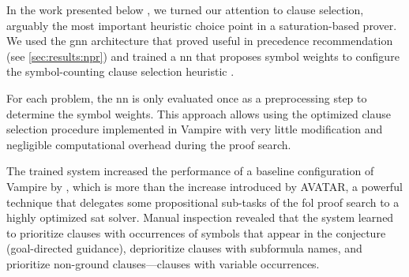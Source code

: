 



\label{sec:results:selection}

In the work presented below \cite{DBLP:conf/lpar/Bartek023},
we turned our attention to clause selection,
arguably the most important heuristic choice point in a saturation-based prover.
We used the \gls{gnn} architecture
that proved useful in precedence recommendation (see \cref{sec:results:npr})
and trained a \gls{nn} that proposes symbol weights to configure the symbol-counting clause selection heuristic \cite{DBLP:conf/cade/SchulzM16,E-manual}.

For each problem, the \gls{nn} is only evaluated once as a preprocessing step to determine the symbol weights.
This approach allows using the optimized clause selection procedure implemented in Vampire
with very little modification and negligible computational overhead during the proof search.

The trained system increased the performance of a baseline configuration of Vampire by ,
which is more than the increase introduced by AVATAR,
a powerful technique that delegates some propositional sub-tasks of the \gls{fol} proof search to a highly optimized \gls{sat} solver.
Manual inspection revealed that
the system learned to
prioritize clauses with occurrences of symbols that appear in the conjecture (goal-directed guidance),
deprioritize clauses with subformula names,
and prioritize non-ground clauses---clauses with variable occurrences.

